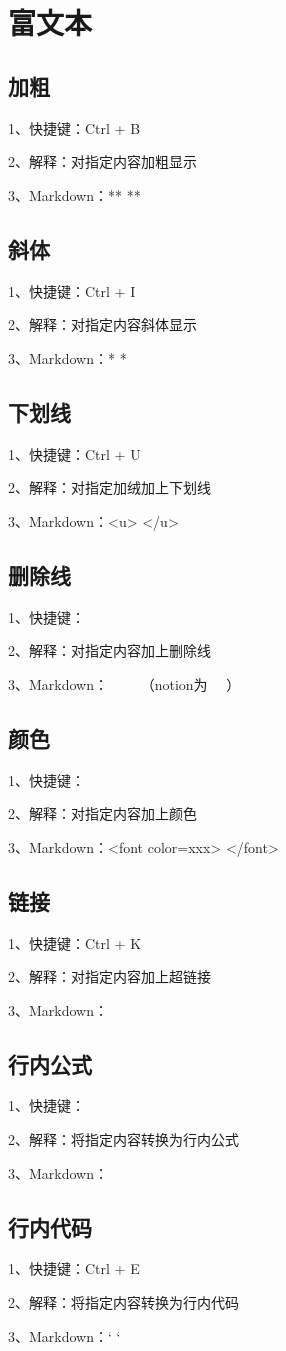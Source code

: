 \chapter{富文本}

\section{加粗}

1、快捷键：Ctrl + B

2、解释：对指定内容加粗显示

3、Markdown：** **

\section{斜体}

1、快捷键：Ctrl + I

2、解释：对指定内容斜体显示

3、Markdown：* *

\section{下划线}

1、快捷键：Ctrl + U

2、解释：对指定加绒加上下划线

3、Markdown：<u> </u>

\section{删除线}

1、快捷键：

2、解释：对指定内容加上删除线

3、Markdown：~~ ~~（notion为~ ~）

\section{颜色}

1、快捷键：

2、解释：对指定内容加上颜色

3、Markdown：<font color=xxx> </font>

\section{链接}

1、快捷键：Ctrl + K

2、解释：对指定内容加上超链接

3、Markdown：

\section{行内公式}

1、快捷键：

2、解释：将指定内容转换为行内公式

3、Markdown：$ $

\section{行内代码}

1、快捷键：Ctrl + E

2、解释：将指定内容转换为行内代码

3、Markdown：`  `

